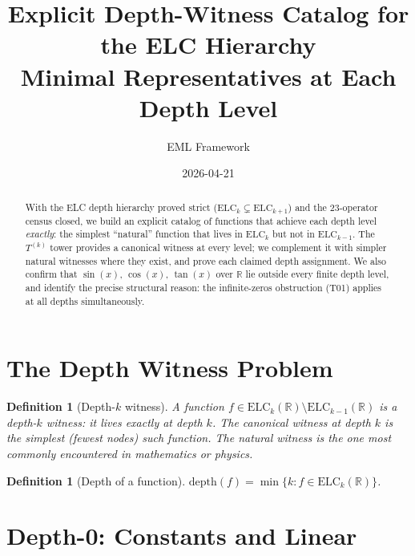 \documentclass[11pt]{article}
\title{Explicit Depth-Witness Catalog for the ELC Hierarchy\\
{\large Minimal Representatives at Each Depth Level}}
\author{EML Framework}
\date{2026-04-21}
\newtheorem{definition}[theorem]{Definition}
\begin{document}
\maketitle

\begin{abstract}
With the ELC depth hierarchy proved strict ($\mathrm{ELC}_k \subsetneq \mathrm{ELC}_{k+1}$)
and the 23-operator census closed, we build an explicit catalog of functions
that achieve each depth level \emph{exactly}: the simplest ``natural'' function
that lives in $\mathrm{ELC}_k$ but not in $\mathrm{ELC}_{k-1}$.
The $T^{(k)}$ tower provides a canonical witness at every level; we complement it
with simpler natural witnesses where they exist, and prove each claimed depth assignment.
We also confirm that $\sin(x)$, $\cos(x)$, $\tan(x)$ over $\mathbb{R}$ lie outside
every finite depth level, and identify the precise structural reason: the infinite-zeros
obstruction (T01) applies at all depths simultaneously.
\end{abstract}

\tableofcontents
\bigskip

\section{The Depth Witness Problem}
\label{sec:setup}

\begin{definition}[Depth-$k$ witness]
A function $f \in \mathrm{ELC}_k(\mathbb{R}) \setminus \mathrm{ELC}_{k-1}(\mathbb{R})$
is a \emph{depth-$k$ witness}: it lives exactly at depth $k$.
The \emph{canonical witness} at depth $k$ is the simplest (fewest nodes) such function.
The \emph{natural witness} is the one most commonly encountered in mathematics or physics.
\end{definition}

\begin{definition}[Depth of a function]
$\mathrm{depth}(f) = \min\{k : f \in \mathrm{ELC}_k(\mathbb{R})\}$.
\end{definition}

\section{Depth-0: Constants and Linear}
\label{sec:depth0}
\end{document}
